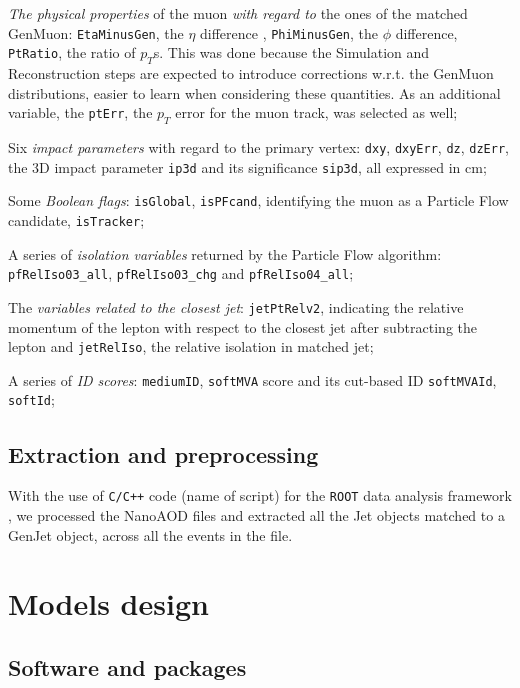 \begin{outline}
\1 \emph{The physical properties} of the muon \emph{with regard to} the ones of the matched GenMuon: \texttt{EtaMinusGen}, the $\eta$ difference , \texttt{PhiMinusGen}, the $\phi$ difference, \texttt{PtRatio}, the ratio of $p_T$s. This was done because the Simulation and Reconstruction steps are expected to introduce corrections w.r.t. the GenMuon distributions, easier to learn when considering these quantities. As an additional variable, the \texttt{ptErr}, the $p_T$ error for the muon track, was selected as well;

\1 Six \emph{impact parameters} with regard to the primary vertex: \texttt{dxy}, \texttt{dxyErr}, \texttt{dz}, \texttt{dzErr}, the 3D impact parameter \texttt{ip3d} and its significance \texttt{sip3d}, all expressed in cm;

\1 Some \emph{Boolean flags}: \texttt{isGlobal}, \texttt{isPFcand}, identifying the muon as a Particle Flow candidate, \texttt{isTracker};

\1 A series of \emph{isolation variables} returned by the Particle Flow algorithm: \texttt{pfRelIso03\_all}, \texttt{pfRelIso03\_chg} and \texttt{pfRelIso04\_all};

\1 The \emph{variables related to the closest jet}: \texttt{jetPtRelv2}, indicating the relative momentum of the lepton with respect to the closest jet after subtracting the lepton and \texttt{jetRelIso}, the relative isolation in matched jet;

\1 A series of \emph{ID scores}: \texttt{mediumID}, \texttt{softMVA} score and its cut-based ID \texttt{softMVAId}, \texttt{softId};
\end{outline}

\subsection{Extraction and preprocessing}
With the use of \texttt{C/C++} code (name of script) for the \texttt{ROOT} data analysis framework \cite{Brun:491486}, we processed the NanoAOD files and extracted all the Jet objects matched to a GenJet object, across all the events in the file.
\section{Models design}

\subsection{Software and packages}

